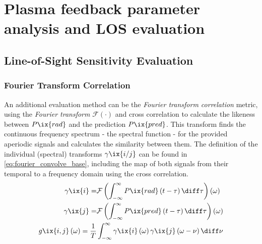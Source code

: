 \chapter{Plasma feedback parameter analysis and LOS evaluation}\label{apx:feedbackeval}%
%
    \section{Line-of-Sight Sensitivity Evaluation}%
%
        \subsection{Fourier Transform Correlation}\label{sec:fouriercorrelate}%
%
            An additional evaluation method can be the \textit{Fourier transform correlation} metric, using the \textit{Fourier transform} $\mathcal{F}\left(\cdot\right)$ and cross correlation to calculate the likeness between $P\ix{rad}$ and the prediction $P\ix{pred}$. This transform finds the continuous frequency spectrum - the spectral function - for the provided aperiodic signals and calculates the similarity between them. The definition of the individual (spectral) transforms $\gamma\ix{i/j}$ can be found in \cref{eq:fourier_convolve_base}, including the map of both signals from their temporal to a frequency domain using the cross correlation.%
%
            \begin{align}%
                \begin{split}\label{eq:fourier_convolve_base}%
                    \gamma\ix{i}=&\mathcal{F}\left(\int_{-\infty}^{\infty}P\ix{rad}\left(t-\tau\right)\diff\tau\right)\left(\omega\right)\\%
                    \gamma\ix{j}=&\mathcal{F}\left(\int_{-\infty}^{\infty}P\ix{pred}\left(t-\tau\right)\diff\tau\right)\left(\omega\right)\\%
                    g\ix{i,j}\left(\omega\right)=\frac{1}{T}&\int_{-\infty}^{\infty}\gamma\ix{i}\left(\omega\right)\gamma\ix{j}\left(\omega-\nu\right)\diff\nu%
                \end{split}%
            \end{align}%
%
